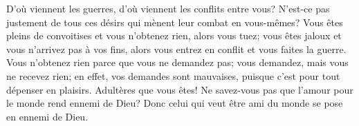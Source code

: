 D’où viennent les guerres, d’où viennent les conflits entre vous?
N’est-ce pas justement de tous ces désirs
	qui mènent leur combat en vous-mêmes?
Vous êtes pleins de convoitises et vous n’obtenez rien, alors vous tuez;
	vous êtes jaloux et vous n’arrivez pas à vos fins,
	alors vous entrez en conflit et vous faites la guerre.
Vous n’obtenez rien parce que vous ne demandez pas;
	vous demandez, mais vous ne recevez rien;
	en effet, vos demandes sont mauvaises,
	puisque c’est pour tout dépenser en plaisirs.
Adultères que vous êtes!
	Ne savez-vous pas que l’amour pour le monde rend ennemi de Dieu?
	Donc celui qui veut être ami du monde se pose en ennemi de Dieu.

